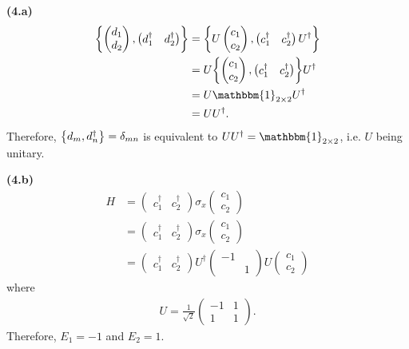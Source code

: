 \documentclass{article}
\makeatletter
\newcommand*{\shifttext}[1]{%
  \settowidth{\@tempdima}{#1}%
  \hspace{-\@tempdima}#1%
}
\newcommand{\plabel}[1]{%
\shifttext{\textbf{#1}\quad}%
}
\newcommand{\minusbaseline}{\abovedisplayskip=0pt\abovedisplayshortskip=0pt~\vspace*{-\baselineskip}}%
\makeatother
\begin{document}
\plabel{(4.a)}%
\begingroup\minusbaseline
\begin{align*}
    \qty{\begin{pmatrix}
        d_1 \\ d_2
    \end{pmatrix}, \begin{pmatrix}
        d_1^\dagger & d_2^\dagger
    \end{pmatrix}} &= \qty{U\begin{pmatrix}
        c_1 \\ c_2
    \end{pmatrix}, \begin{pmatrix}
        c_1^\dagger & c_2^\dagger
    \end{pmatrix} U^\dagger} \\
    &= U\qty{\begin{pmatrix}
        c_1 \\ c_2
    \end{pmatrix}, \begin{pmatrix}
        c_1^\dagger & c_2^\dagger
    \end{pmatrix}} U^\dagger \\
    &= U \mathbbm{1}_{2\times 2} U^\dagger \\
    &= UU^\dagger.
\end{align*}
\endgroup
Therefore, $\qty{d_m,d^\dagger_n} = \delta_{mn}$ is equivalent to $UU^\dagger = \mathbbm{1}_{2\times 2}$, i.e. $U$ being unitary.

\plabel{(4.b)}%
\begingroup\minusbaseline
\begin{align*}
    H &= \begin{pmatrix}
        c^\dagger_1 & c^\dagger_2
    \end{pmatrix} \sigma_x \begin{pmatrix}
        c_1 \\ c_2
    \end{pmatrix} \\
    &= \begin{pmatrix}
        c^\dagger_1 & c^\dagger_2
    \end{pmatrix} \sigma_x \begin{pmatrix}
        c_1 \\ c_2
    \end{pmatrix} \\
    &= \begin{pmatrix}
        c^\dagger_1 & c^\dagger_2
    \end{pmatrix} U^\dagger \begin{pmatrix}
        -1 & \\ & 1
    \end{pmatrix} U \begin{pmatrix}
        c_1 \\ c_2
    \end{pmatrix}
\end{align*}
\endgroup
where
\begin{align*}
    U = \frac{1}{\sqrt{2}}\begin{pmatrix}
        -1 & 1 \\ 1 & 1
    \end{pmatrix}.
\end{align*}
Therefore, $E_1 = -1$ and $E_2 = 1$.
\end{document}
